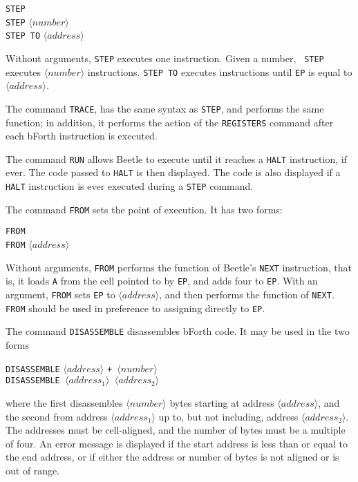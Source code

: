 \documentclass{article}
\newcommand{\angb}[1]{$\langle #1\rangle$}
\begin{document}
\begin{center}
{\tt STEP}\\
{\tt STEP} \angb{number}\\
{\tt STEP TO} \angb{address}
\end{center}

Without arguments, {\tt STEP} executes one instruction. Given a number, {\tt
STEP} executes \angb{number} instructions. {\tt STEP TO} executes
instructions until {\tt EP} is equal to \angb{address}.

The command {\tt TRACE}, has the same syntax as {\tt STEP}, and performs the
same function; in addition, it performs the action of the {\tt REGISTERS}
command after each bForth instruction is executed.

The command {\tt RUN} allows Beetle to execute until it reaches a {\tt HALT}
instruction, if ever. The code passed to {\tt HALT} is then displayed. The
code is also displayed if a {\tt HALT} instruction is ever executed during a
{\tt STEP} command.

\label{from}
The command {\tt FROM} sets the point of execution. It has two forms:

\begin{center}
{\tt FROM}\\
{\tt FROM} \angb{address}
\end{center}

Without arguments, {\tt FROM} performs the function of Beetle's {\tt NEXT}
instruction, that is, it loads {\tt A} from the cell pointed to by {\tt EP},
and adds four to {\tt EP}. With an argument, {\tt FROM} sets {\tt EP} to
\angb{address}, and then performs the function of {\tt NEXT}. {\tt FROM}
should be used in preference to assigning directly to {\tt EP}.

The command {\tt DISASSEMBLE} disassembles bForth code. It may be used in the
two forms

\begin{center}
{\tt DISASSEMBLE} \angb{address} \tt{+} \angb{number}\\
{\tt DISASSEMBLE} \angb{address_1} \angb{address_2}
\end{center}

where the first disassembles \angb{number} bytes starting at address
\angb{address}, and the second from address \angb{address_1} up to, but not
including, address \angb{address_2}. The addresses must be cell-aligned, and
the number of bytes must be a multiple of four. An error message is displayed
if the start address is less than or equal to the end address, or if either
the address or number of bytes is not aligned or is out of range.
\end{document}
